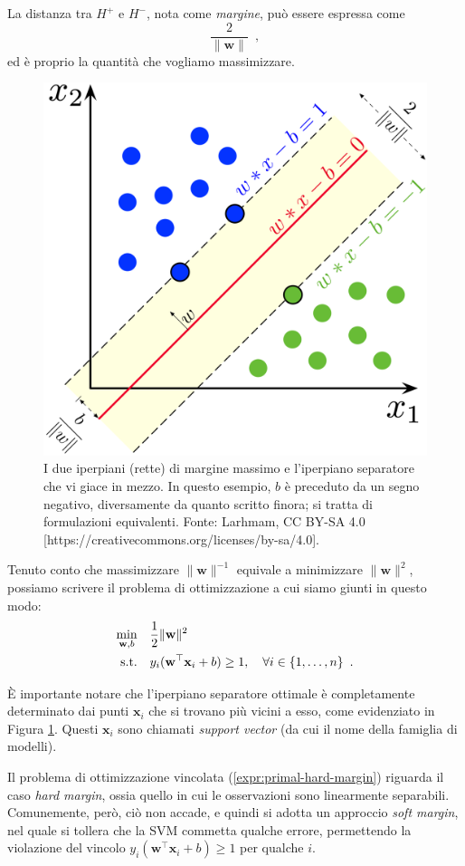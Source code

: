 La distanza tra $H^+$ e $H^-$, nota come \textit{margine}, può essere espressa come
\begin{equation}
    \frac{2}{\|\mathbf{w}\|} \enspace ,
\end{equation}
ed è proprio la quantità che vogliamo massimizzare.

\begin{figure}[ht]
    \centering
    \includegraphics[width=0.5\linewidth]{images/svm-margin.png}
    \caption{I due iperpiani (rette) di margine massimo e l'iperpiano separatore che vi giace in mezzo. In questo esempio, $b$ è preceduto da un segno negativo, diversamente da quanto scritto finora; si tratta di formulazioni equivalenti. Fonte: Larhmam, CC BY-SA 4.0 [https://creativecommons.org/licenses/by-sa/4.0].}
    \label{fig:svm-margin}
\end{figure}

Tenuto conto che massimizzare $\|\mathbf{w}\|^{-1}$ equivale a minimizzare $\|\mathbf{w}\|^2$, possiamo scrivere il problema di ottimizzazione a cui siamo giunti in questo modo:
\begin{equation}
    \begin{aligned}
    \min_{\mathbf{w},b} \quad & \frac{1}{2}\|\mathbf{w}\|^2 \\
    \text{s.t.} \quad & y_i(\mathbf{w}^{\top} \mathbf{x}_i +b) \geq 1, \quad \forall \space i \in \{1, \dots, n\} \enspace .
    \end{aligned}
    \label{expr:primal-hard-margin}
\end{equation}

È importante notare che l'iperpiano separatore ottimale è completamente determinato dai punti $\mathbf{x}_i$ che si trovano più vicini a esso, come evidenziato in Figura \ref{fig:svm-margin}. Questi $\mathbf{x}_i$ sono chiamati \textit{support vector} (da cui il nome della famiglia di modelli).

Il problema di ottimizzazione vincolata (\ref{expr:primal-hard-margin}) riguarda il caso \textit{hard margin}, ossia quello in cui le osservazioni sono linearmente separabili. Comunemente, però, ciò non accade, e quindi si adotta un approccio \textit{soft margin}, nel quale si tollera che la SVM commetta qualche errore, permettendo la violazione del vincolo $y_i(\mathbf{w}^{\top} \mathbf{x}_i +b) \geq 1$ per qualche $i$.

